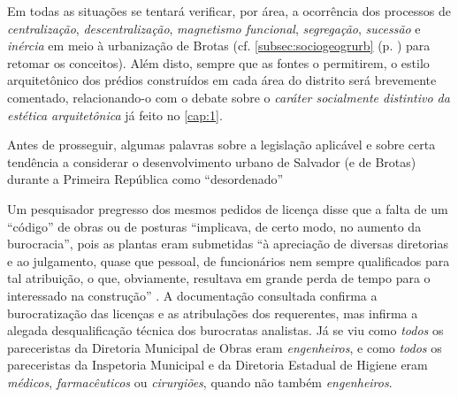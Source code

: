 Em todas as situações se tentará verificar, por área, a ocorrência dos processos de \textit{centralização}, \textit{descentralização}, \textit{magnetismo funcional}, \textit{segregação}, \textit{sucessão} e \textit{inércia} em meio à urbanização de Brotas (cf. \autoref{subsec:sociogeogrurb} (p. \pageref{subsec:sociogeogrurb}) para retomar os conceitos). Além disto, sempre que as fontes o permitirem, o estilo arquitetônico dos prédios construídos em cada área do distrito será brevemente comentado, relacionando-o com o debate sobre o \textit{caráter socialmente distintivo da estética arquitetônica} já feito no \autoref{cap:1}.

Antes de prosseguir, algumas palavras sobre a legislação aplicável e sobre certa tendência a considerar o desenvolvimento urbano de Salvador (e de Brotas) durante a Primeira República como ``desordenado''

Um pesquisador pregresso dos mesmos pedidos de licença disse que a falta de um ``código'' de obras ou de posturas ``implicava, de certo modo, no aumento da burocracia'', pois as plantas eram submetidas ``à apreciação de diversas diretorias e ao julgamento, quase que pessoal, de funcionários nem sempre qualificados para tal atribuição, o que, obviamente, resultava em grande perda de tempo para o interessado na construção'' \cite[p.~89]{cardoso_vilas_1991}. A documentação consultada confirma a burocratização das licenças e as atribulações dos requerentes, mas infirma a alegada desqualificação técnica dos burocratas analistas. Já se viu como \textit{todos} os pareceristas da Diretoria Municipal de Obras eram \textit{engenheiros}, e como \textit{todos} os pareceristas da Inspetoria Municipal e da Diretoria Estadual de Higiene eram \textit{médicos}, \textit{farmacêuticos} ou \textit{cirurgiões}, quando não também \textit{engenheiros}. 

